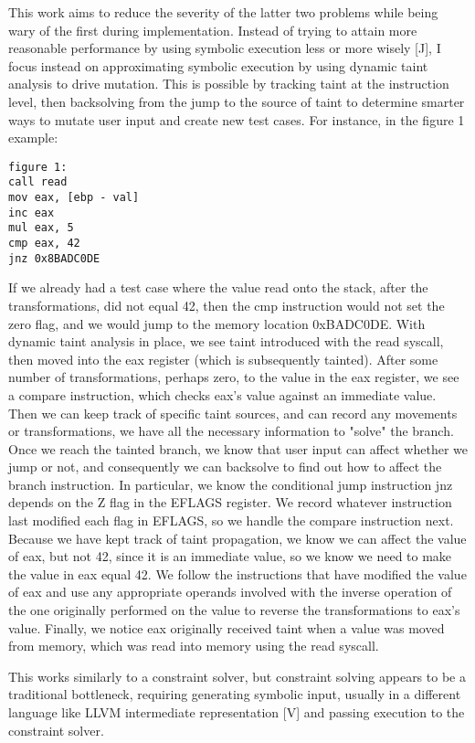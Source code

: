 \documentclass[11pt,expanded,copyright]{fsuthesis}
\begin{document}
This work aims to reduce the severity of the latter two problems while being wary of the first during implementation. Instead of trying to attain more reasonable performance by using symbolic execution less or more wisely [J], I focus instead on approximating symbolic execution by using dynamic taint analysis to drive mutation. This is possible by tracking taint at the instruction level, then backsolving from the jump to the source of taint to determine smarter ways to mutate user input and create new test cases. For instance, in the figure 1 example:
\\

\begin{verbatim}
figure 1:
call read
mov eax, [ebp - val]
inc eax
mul eax, 5
cmp eax, 42
jnz 0x8BADC0DE
\end{verbatim}

If we already had a test case where the value read onto the stack, after the transformations, did not equal 42, then the cmp instruction would not set the zero flag, and we would jump to the memory location 0xBADC0DE. With dynamic taint analysis in place, we see taint introduced with the read syscall, then moved into the eax register (which is subsequently tainted). After some number of transformations, perhaps zero, to the value in the eax register, we see a compare instruction, which checks eax's value against an immediate value. Then we can keep track of specific taint sources, and can record any movements or transformations, we have all the necessary information to "solve" the branch. Once we reach the tainted branch, we know that user input can affect whether we jump or not, and consequently we can backsolve to find out how to affect the branch instruction. In particular, we know the conditional jump instruction jnz depends on the Z flag in the EFLAGS register. We record whatever instruction last modified each flag in EFLAGS, so we handle the compare instruction next. Because we have kept track of taint propagation, we know we can affect the value of eax, but not 42, since it is an immediate value, so we know we need to make the value in eax equal 42. We follow the instructions that have modified the value of eax and use any appropriate operands involved with the inverse operation of the one originally performed on the value to reverse the transformations to eax's value. Finally, we notice eax originally received taint when a value was moved from memory, which was read into memory using the read syscall.

This works similarly to a constraint solver, but constraint solving appears to be a traditional bottleneck, requiring generating symbolic input, usually in a different language like LLVM intermediate representation [V] and passing execution to the constraint solver.
\end{document}
